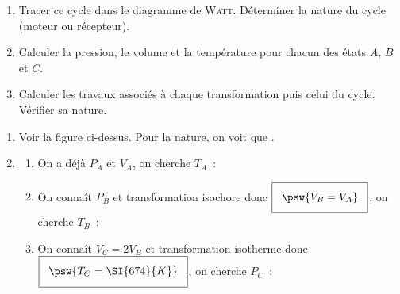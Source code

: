 \documentclass[../../main/main.tex]{subfiles}
\begin{document}
\begin{tcb*}[breakable]
\begin{isd}[righthand ratio=.40]
\begin{center}
		\end{center}
	\end{isd}
	\begin{enumerate}[label=\sqenumi]
		\item Tracer ce cycle dans le diagramme de \textsc{Watt}. Déterminer la
		      nature du cycle (moteur ou récepteur).
		\item Calculer la pression, le volume et la température pour chacun des
		      états $A$, $B$ et $C$.
		\item Calculer les travaux associés à chaque transformation puis celui du
		      cycle. Vérifier sa nature.
	\end{enumerate}
	\tcblower
	\begin{enumerate}[label=\sqenumi]
		\item Voir la figure ci-dessus. Pour la nature, on voit que
		      .
		\item
		      \begin{enumerate}[label=\clalphi]
			      \item On a déjà $P_A$ et $V_A$, on cherche $T_A$~:
			            \psw{%
				            \[
					            \boxed{T_A = \frac{P_AV_A}{nR}}
					            \Ra
					            \xul{T_A = \SI{337}{K}}
					            \qav
					            \left\{
					            \begin{array}{rcl}
						            P_A & = & \SI{2e5}{Pa}
						            \\
						            V_A & = & \SI{1.4e-2}{m^3}
						            \\
						            n   & = & \SI{1}{mol}
						            \\
						            R   & = & \SI{8.314}{J.K^{-1}.mol^{-1}}
					            \end{array}
					            \right.
				            \]
			            }%
			      \item On connaît $P_B$ et transformation isochore donc
			            $\setlength{\fboxsep}{3mm}\boxed{\psw{V_B = V_A}}$, on cherche $T_B$~:
			            \psw{%
				            \[
					            \boxed{T_B = \frac{P_BV_B}{nR}}
					            \Ra
					            \xul{T_B = \SI{674}{K}}
				            \]
			            }%
			      \item On connaît $V_C = 2V_B$ et transformation isotherme donc
			            $\setlength{\fboxsep}{3mm}\boxed{\psw{T_C = \SI{674}{K}}}$, on cherche
			            $P_C$~:

\end{enumerate}
\end{enumerate}
\end{tcb*}
\end{document}
